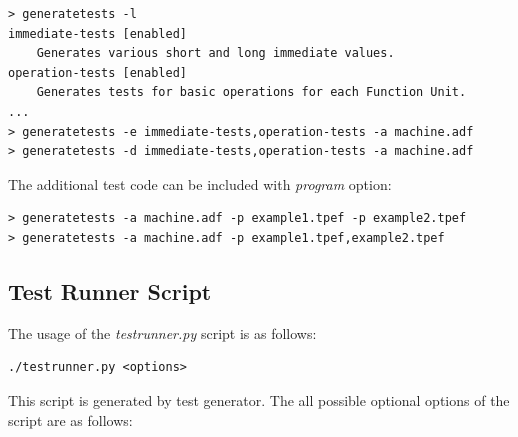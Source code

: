 \documentclass[a4paper,twoside]{tceusermanual}
\begin{document}
\begin{verbatim}
> generatetests -l
immediate-tests [enabled]
    Generates various short and long immediate values.
operation-tests [enabled]
    Generates tests for basic operations for each Function Unit.
...
> generatetests -e immediate-tests,operation-tests -a machine.adf
> generatetests -d immediate-tests,operation-tests -a machine.adf
\end{verbatim}

The additional test code can be included with \emph{program} option:

\begin{verbatim}
> generatetests -a machine.adf -p example1.tpef -p example2.tpef
> generatetests -a machine.adf -p example1.tpef,example2.tpef
\end{verbatim}

\subsection{Test Runner Script}
\label{subsection:testrunner}

The usage of the \emph{testrunner.py} script is as follows:

\begin{verbatim}
./testrunner.py <options>
\end{verbatim}

This script is generated by test generator. The all possible optional
options of the script are as follows:
\end{document}
